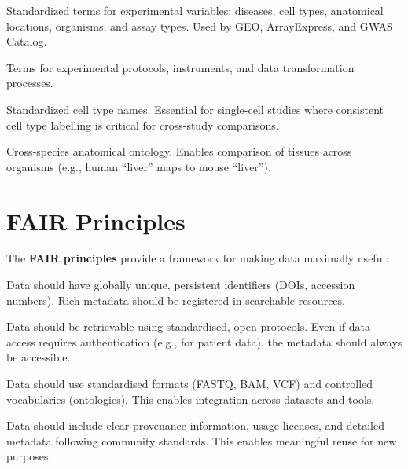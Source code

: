 \begin{description}[style=nextline, font=\bfseries, itemsep=3pt]
  \item[EFO (Experimental Factor Ontology)]
  Standardized terms for experimental variables: diseases, cell types, anatomical locations, organisms, and assay types. Used by GEO, ArrayExpress, and GWAS Catalog.

  \item[OBI (Ontology for Biomedical Investigations)]
  Terms for experimental protocols, instruments, and data transformation processes.

  \item[CL (Cell Ontology)]
  Standardized cell type names. Essential for single-cell studies where consistent cell type labelling is critical for cross-study comparisons.

  \item[UBERON]
  Cross-species anatomical ontology. Enables comparison of tissues across organisms (e.g., human ``liver'' maps to mouse ``liver'').
\end{description}

\section{FAIR Principles}
\label{sec:datastandards:fair}

The \textbf{FAIR principles} provide a framework for making data maximally useful:

\begin{keyconcept}[title={FAIR Data Principles}]
\begin{description}[font=\bfseries, itemsep=3pt]
  \item[Findable] Data should have globally unique, persistent identifiers (DOIs, accession numbers). Rich metadata should be registered in searchable resources.
  \item[Accessible] Data should be retrievable using standardised, open protocols. Even if data access requires authentication (e.g., for patient data), the metadata should always be accessible.
  \item[Interoperable] Data should use standardised formats (FASTQ, BAM, VCF) and controlled vocabularies (ontologies). This enables integration across datasets and tools.
  \item[Reusable] Data should include clear provenance information, usage licenses, and detailed metadata following community standards. This enables meaningful reuse for new purposes.
\end{description}
\end{keyconcept}

